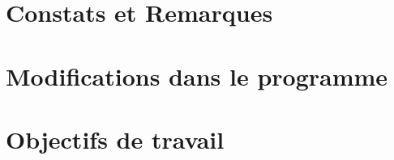 \documentclass[12pt]{beamer}
\newcommand\FontReduce{\fontsize{8}{10}\selectfont}
\begin{document}

\section{Constats et Remarques}
	
	
\section{Modifications dans le programme}

\section{Objectifs de travail}
\end{document}
